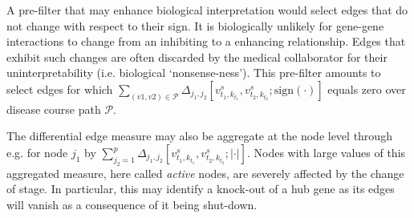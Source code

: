 \documentclass[10pt]{article}
\newcommand{\red}[1]{{\textcolor {red} {#1}}}
\begin{document}

A pre-filter that may enhance biological interpretation would select edges that do not change with respect to their sign. It is biologically unlikely for gene-gene interactions to change from an inhibiting to a enhancing relationship. Edges that exhibit such changes are often discarded by the medical collaborator for their uninterpretability (i.e. biological `nonsense-ness'). This pre-filter amounts to select edges for which $\sum_{(v1,v2)\in \mathcal{P}} \Delta_{j_1,j_2} [v^s_{t_1, k_{t_1}}, v^s_{t_2, k_{t_2}}; \mbox{sign}(\cdot)]$ equals zero over disease course path $\mathcal{P}$.

The differential edge measure may also be aggregate at the node level through e.g. for node $j_1$ by $\sum_{j_2=1}^p \Delta_{j_1,j_2} [v^s_{t_1, k_{t_1}}, v^s_{t_2, k_{t_2}}; |\cdot|]$. Nodes with large values of this aggregated measure, here called \textit{active} nodes, are severely affected by the change of stage. In particular, this may identify a knock-out of a hub gene as its edges will vanish as a consequence of it being shut-down. 
\end{document}
